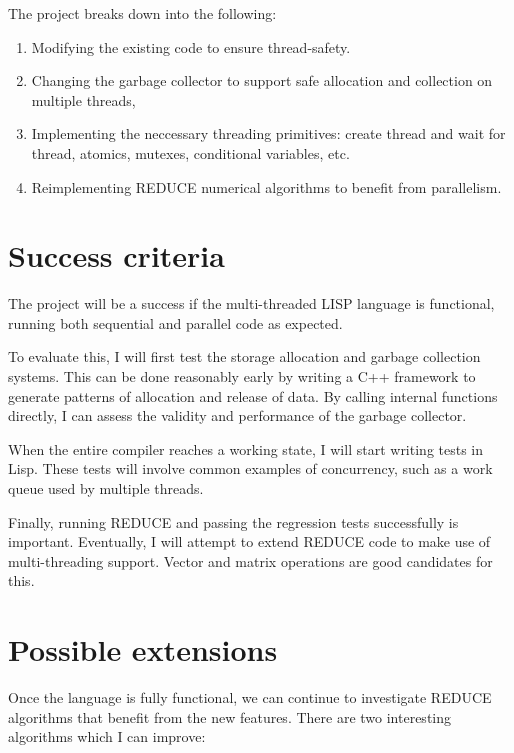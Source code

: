 \documentclass[12pt,a4paper,twoside]{article}
\begin{document}
The project breaks down into the following:

\begin{enumerate}

\item Modifying the existing code to ensure thread-safety.

\item Changing the garbage collector to support safe allocation and
collection on multiple threads,

\item Implementing the neccessary threading primitives: create thread and
wait for thread, atomics, mutexes, conditional variables, etc. 

\item Reimplementing REDUCE numerical algorithms to benefit from parallelism.

\end{enumerate}

\section*{Success criteria}

The project will be a success if the multi-threaded LISP language is functional,
running both sequential and parallel code as expected.

To evaluate this, I will first test the storage allocation and garbage
collection systems. This can be done reasonably early by writing a C++ framework
to generate patterns of allocation and release of data. By calling  internal
functions directly, I can assess the validity and performance of the
garbage collector.

When the entire compiler reaches a working state, I will start writing tests
in Lisp. These tests will involve common examples of concurrency, such as a
work queue used by multiple threads.

Finally, running REDUCE and passing the regression tests successfully is
important. Eventually, I will attempt to extend REDUCE code to make use
of multi-threading support. Vector and matrix operations are good candidates
for this.

\section*{Possible extensions}

Once the language is fully functional, we can continue to investigate REDUCE
algorithms that benefit from the new features. There are two interesting
algorithms which I can improve:
\end{document}
